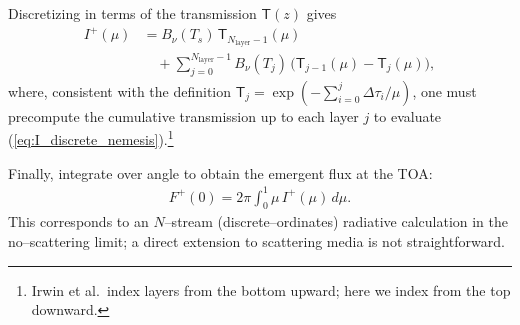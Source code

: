 Discretizing in terms of the transmission $\mathsf{T}(z)$ gives
\begin{align}
\label{eq:I_discrete_nemesis}
I^+(\mu) &= B_\nu(T_s)\, \mathsf{T}_{N_{\mathrm{layer}}-1}(\mu) \nonumber \\
&\quad + \sum_{j=0}^{N_{\mathrm{layer}}-1} B_\nu(T_j)\,\bigl(\mathsf{T}_{j-1}(\mu) - \mathsf{T}_j(\mu)\bigr) ,
\end{align}
where, consistent with the definition $\mathsf{T}_j = \exp\!\left(-\sum_{i=0}^{j} \Delta\tau_i/\mu\right)$, one must precompute the cumulative transmission up to each layer $j$ to evaluate (\ref{eq:I_discrete_nemesis}).\footnote{Irwin et al.\ index layers from the bottom upward; here we index from the top downward.}

Finally, integrate over angle to obtain the emergent flux at the TOA:
\begin{align}
    F^+(0) = 2\pi \int_{0}^{1} \mu \, I^+(\mu)\, d\mu .
\end{align}
This corresponds to an $N$–stream (discrete–ordinates) radiative calculation in the no–scattering limit; a direct extension to scattering media is not straightforward.
